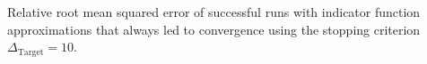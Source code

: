 Relative root mean squared error of successful runs with indicator function approximations that always led to convergence using the stopping criterion $\Delta_{\text{Target}} = 10$.
